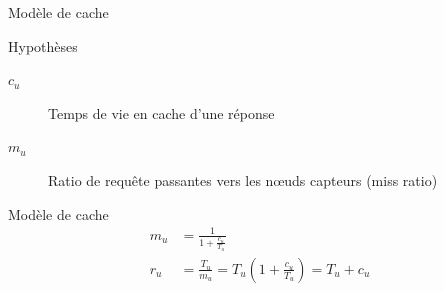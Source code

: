 \begin{frame}{Modèle de cache}
  \begin{block}{Hypothèses}
    \begin{description}
      \item[$c_u$] Temps de vie en cache d'une réponse
      \item[$m_u$] Ratio de requête passantes vers les nœuds capteurs (miss ratio)
    \end{description}
  \end{block}
  \begin{alertblock}{Modèle de cache}
    \begin{align}
      m_u &= \frac{1}{1 + \frac{c_u}{T_u}}
      \label{cache:eq:cache_miss}\\
      r_u &= \frac{T_u}{m_u} = T_u \left (1 + \frac{c_u}{T_u} \right) = T_u + c_u
    \end{align}
  \end{alertblock}
\end{frame}


